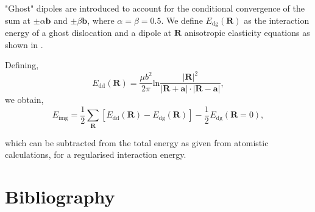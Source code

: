 \documentclass[a4paper,11pt]{article}
\begin{document}
"Ghost" dipoles are introduced to account for the conditional convergence of the sum at \(\pm\alpha
   \mathbf{b}\) and \(\pm \beta\mathbf{b}\), where \(\alpha = \beta = 0.5\). We define \(E_{\text{dg}} (\mathbf{R})\) as the
interaction energy of a ghost dislocation and a dipole at \(\mathbf{R}\) anisotropic elasticity
equations as shown in \cite{Cai2003}.


Defining, 
 \[ E_{\text{dd}} (\mathbf{R}) = \frac{\mu b^2}{2\pi}
   \text{ln}\frac{|\mathbf{R}|^2}{|\mathbf{R}+\mathbf{a}|\cdot|\mathbf{R}-\mathbf{a}|},
   \]
we obtain,
\[ E_{\text{img}} = \frac{1}{2}\sum_{\mathbf{R}} [ E_{\text{dd}} (\mathbf{R}) - E_{\text{dg}} (\mathbf{R}) ] - \frac{1}{2}_{}
   E_{\text{dg}} (\mathbf{R} = 0),  \]

which can be subtracted from the total energy as given from atomistic calculations, for a
regularised interaction energy. 

\section{Bibliography}
\label{sec:orgaf6ff7e}
\label{orgf21e9fb}




\end{document}
